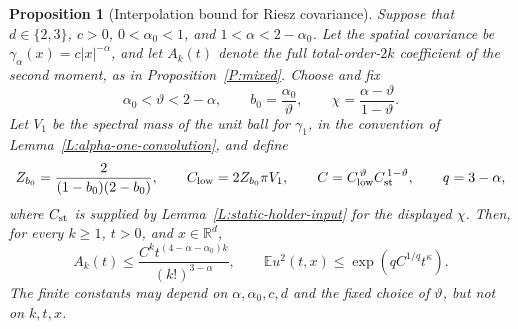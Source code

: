 \documentclass[12pt,oneside,openany]{book}
\numberwithin{equation}{section}
\newtheorem{proposition}[theorem]{Proposition}
\theoremstyle{nogostyle}
\theoremstyle{definition}
\newcommand{\R}{\mathbb{R}}
\newcommand{\E}{\mathbb{E}}
\begin{document}
\begin{proposition}[Interpolation bound for Riesz covariance]
  \label{P:static-holder-upper}
  Suppose that $d \in \{2,3\}$, $c > 0$, $0 < \alpha_0 < 1$, and $1 < \alpha <
  2-\alpha_0$. Let the spatial covariance be $\gamma_\alpha(x) =
  c|x|^{-\alpha}$, and let $A_k(t)$ denote the full total-order-$2k$ coefficient
  of the second moment, as in Proposition~\ref{P:mixed}. Choose and fix
  \begin{equation}\label{E:static-holder-parameters}
    \alpha_0<\vartheta<2-\alpha,\qquad
    b_0=\frac{\alpha_0}{\vartheta},\qquad
    \chi=\frac{\alpha-\vartheta}{1-\vartheta}.
  \end{equation}
  Let $V_1$ be the spectral mass of the unit ball for $\gamma_1$, in the
  convention of Lemma~\ref{L:alpha-one-convolution}, and define
  \[
    Z_{b_0}=\frac2{(1-b_0)(2-b_0)},\qquad
    C_{\rm low}=2Z_{b_0}\pi V_1,\qquad
    C=C_{\rm low}^{\,\vartheta}C_{\rm st}^{\,1-\vartheta},
    \qquad q=3-\alpha,
  \]
  where $C_{\rm st}$ is supplied by Lemma~\ref{L:static-holder-input} for the
  displayed $\chi$. Then, for every $k \ge 1$, $t > 0$, and $x \in \R^d$,
  \begin{equation}\label{E:static-holder-upper}
    A_k(t)\le\frac{C^kt^{(4-\alpha-\alpha_0)k}}{(k!)^{3-\alpha}},
    \qquad
    \E u^2(t,x)\le\exp\left(qC^{1/q}t^\kappa\right).
  \end{equation}
  The finite constants may depend on $\alpha,\alpha_0,c,d$ and the fixed choice
  of $\vartheta$, but not on $k,t,x$.
\end{proposition}
\end{document}
